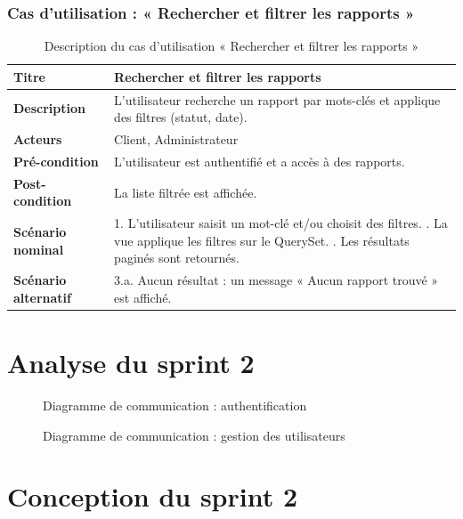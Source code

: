 \subsubsection{Cas d'utilisation : « Rechercher et filtrer les rapports »}
\begin{table}[h!]
\centering
\renewcommand{\arraystretch}{1.3}
\begin{tabularx}{\textwidth}{|l|X|}
\hline
\textbf{Titre} & Rechercher et filtrer les rapports \\ \hline
\textbf{Description} & L'utilisateur recherche un rapport par mots-clés et applique
des filtres (statut, date). \\ \hline
\textbf{Acteurs} & Client, Administrateur \\ \hline
\textbf{Pré-condition} & L'utilisateur est authentifié et a accès à des rapports. \\ \hline
\textbf{Post-condition} & La liste filtrée est affichée. \\ \hline
\textbf{Scénario nominal} &
1. L'utilisateur saisit un mot-clé et/ou choisit des filtres. \newline
2. La vue applique les filtres sur le QuerySet. \newline
3. Les résultats paginés sont retournés. \\ \hline
\textbf{Scénario alternatif} &
3.a. Aucun résultat : un message « Aucun rapport trouvé » est affiché. \\ \hline
\end{tabularx}
\caption{Description du cas d'utilisation « Rechercher et filtrer les rapports »}
\end{table}

\section{Analyse du sprint 2}
\begin{figure}[h!]
\centering
{}
\caption{Diagramme de communication : authentification}
\end{figure}

\begin{figure}[h!]
\centering
{}
\caption{Diagramme de communication : gestion des utilisateurs}
\end{figure}

\section{Conception du sprint 2}


